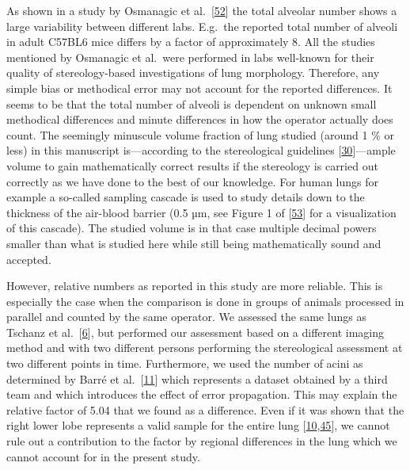 \documentclass[
  american,
]{article}
\begin{document}
As shown in a study by Osmanagic et al.~{[}\protect\hyperlink{ref-LzalnLBH}{52}{]} the total alveolar number shows a large variability between different labs.
E.g.~the reported total number of alveoli in adult C57BL6 mice differs by a factor of approximately 8.
All the studies mentioned by Osmanagic et al.~were performed in labs well-known for their quality of stereology-based investigations of lung morphology.
Therefore, any simple bias or methodical error may not account for the reported differences.
It seems to be that the total number of alveoli is dependent on unknown small methodical differences and minute differences in how the operator actually does count.
The seemingly minuscule volume fraction of lung studied (around 1 \% or less) in this manuscript is---according to the stereological guidelines {[}\protect\hyperlink{ref-dNc8FfNn}{30}{]}---ample volume to gain mathematically correct results if the stereology is carried out correctly as we have done to the best of our knowledge.
For human lungs for example a so-called sampling cascade is used to study details down to the thickness of the air-blood barrier (0.5 µm, see Figure 1 of {[}\protect\hyperlink{ref-1CLJ32t5m}{53}{]} for a visualization of this cascade).
The studied volume is in that case multiple decimal powers smaller than what is studied here while still being mathematically sound and accepted.

However, relative numbers as reported in this study are more reliable.
This is especially the case when the comparison is done in groups of animals processed in parallel and counted by the same operator.
We assessed the same lungs as Tschanz et al.~{[}\protect\hyperlink{ref-wnl86DEM}{6}{]}, but performed our assessment based on a different imaging method and with two different persons performing the stereological assessment at two different points in time.
Furthermore, we used the number of acini as determined by Barré et al.~{[}\protect\hyperlink{ref-uFNlWogb}{11}{]} which represents a dataset obtained by a third team and which introduces the effect of error propagation.
This may explain the relative factor of 5.04 that we found as a difference.
Even if it was shown that the right lower lobe represents a valid sample for the entire lung {[}\protect\hyperlink{ref-14OP85b2F}{10},\protect\hyperlink{ref-I9TmP6IU}{45}{]}, we cannot rule out a contribution to the factor by regional differences in the lung which we cannot account for in the present study.
\end{document}
